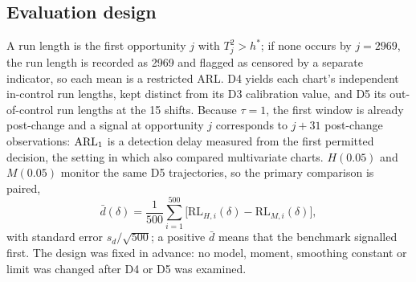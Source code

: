 \subsection{Evaluation design}

A run length is the first opportunity $j$ with $T_j^2>h^*$; if none occurs by $j=2969$, the run
length is recorded as 2969 and flagged as censored by a separate indicator, so each mean is a
restricted ARL. D4 yields each chart's independent in-control run lengths, kept distinct from its D3
calibration value, and D5 its out-of-control run lengths at the 15 shifts. Because $\tau=1$, the first window is already post-change and a signal at
opportunity $j$ corresponds to $j+31$ post-change observations: $\mathrm{ARL}_1$ is a detection delay
measured from the first permitted decision, the setting in which \citet{lowry_multivariate_1992}
also compared multivariate charts. $H(0.05)$ and $M(0.05)$ monitor the same D5 trajectories, so the
primary comparison is paired,
\begin{equation}
\bar d(\delta)=\frac{1}{500}\sum_{i=1}^{500}\big[\mathrm{RL}_{H,i}(\delta)-\mathrm{RL}_{M,i}(\delta)\big],
\label{eq:paired}
\end{equation}
with standard error $s_d/\sqrt{500}$; a positive $\bar d$ means that the benchmark signalled first.
The design was fixed in advance: no model, moment, smoothing constant or limit was changed after D4
or D5 was examined.
